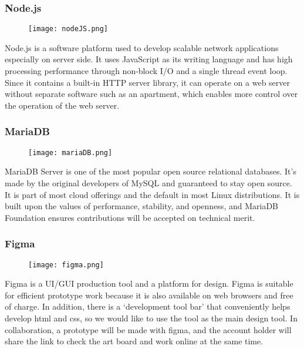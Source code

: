 \documentclass[conference]{IEEEtran}
\begin{document}
\subsubsection{Node.js}
\par \begin{figure}[H]
\texttt{[image: nodeJS.png]}
\centering
\end{figure}
Node.js is a software platform used to develop scalable network applications especially on server side. It uses JavaScript as its writing language and has high processing performance through non-block I/O and a single thread event loop. Since it contains a built-in HTTP server library, it can operate on a web server without separate software such as an apartment, which enables more control over the operation of the web server.
\vspace{1\baselineskip}
\subsubsection{MariaDB}
\par \begin{figure}[H]
\texttt{[image: mariaDB.png]}
\centering
\end{figure}
MariaDB Server is one of the most popular open source relational databases. It’s made by the original developers of MySQL and guaranteed to stay open source. It is part of most cloud offerings and the default in most Linux distributions. It is built upon the values of performance, stability, and openness, and MariaDB Foundation ensures contributions will be accepted on technical merit.
\vspace{1\baselineskip}
\subsubsection{Figma}
\par \begin{figure}[H]
\texttt{[image: figma.png]}
\centering
\end{figure}
Figma is a UI/GUI production tool and a platform for design. Figma is suitable for efficient prototype work because it is also available on web browsers and free of charge. In addition, there is a ‘development tool bar’ that conveniently helps develop html and css, so we would like to use the tool as the main design tool. In collaboration, a prototype will be made with figma, and the account holder will share the link to check the art board and work online at the same time.
\vspace{1\baselineskip}
\end{document}
